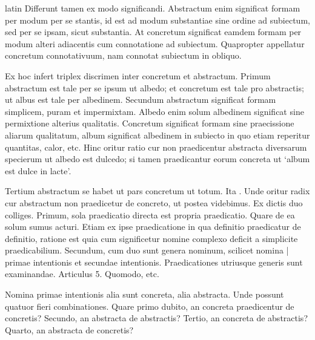 \begin{otherlanguage*}{latin}
\pstart
Differunt tamen ex modo significandi. Abstractum enim significat formam per modum per se stantis, id est ad modum substantiae sine ordine ad subiectum, sed per se ipsam, sicut substantia. At concretum significat eamdem formam per modum alteri adiacentis cum connotatione ad subiectum. Quapropter appellatur concretum connotativuum, nam connotat subiectum in obliquo. 
\pend

\pstart
Ex hoc infert  triplex discrimen inter concretum et abstractum. Primum abstractum est tale per se ipsum ut albedo; et concretum est tale pro abstractis; ut albus est tale per albedinem. Secundum abstractum significat formam simplicem, puram et impermixtam. Albedo enim solum albedinem significat sine permixtione alterius qualitatis. Concretum significat formam sine praecissione aliarum qualitatum, album significat albedinem in subiecto in quo etiam reperitur quantitas, calor, etc. Hinc oritur ratio cur non praedicentur abstracta diversarum specierum ut albedo est dulcedo; si tamen praedicantur eorum concreta ut `album est dulce in lacte'. 
\pend

\pstart
Tertium abstractum se habet ut pars concretum ut totum. Ita . Unde oritur radix cur abstractum non praedicetur de concreto, ut postea videbimus. Ex dictis duo colliges. Primum, sola praedicatio directa est propria praedicatio. Quare de ea solum sumus acturi. Etiam ex ipse praedicatione in qua definitio praedicatur de definitio, ratione est quia cum significetur nomine complexo deficit a simplicite praedicabilium. Secundum, cum duo sunt genera nominum, scilicet nomina \textnormal{|} primae intentionis et secundae intentionis. Praedicationes utriusque generis sunt examinandae. Articulus 5. Quomodo, etc. 
\pend

\pstart
{}
\pend

\pstart
Nomina primae intentionis alia sunt concreta, alia abstracta. Unde possunt quatuor fieri combinationes. Quare primo dubito, an concreta praedicentur de concretis? Secundo, an abstracta de abstractis? Tertio, an concreta de abstractis? Quarto, an abstracta de concretis? 
\pend


\end{otherlanguage*}
